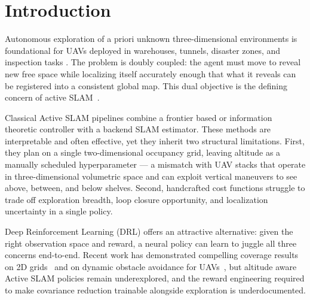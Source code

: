 \documentclass[conference]{IEEEtran}
\begin{document}
\section{Introduction}

Autonomous exploration of a priori unknown three-dimensional environments is foundational for UAVs deployed in warehouses, tunnels, disaster zones, and inspection tasks \cite{qin2019autonomous, zhang2026adaptive}. The problem is doubly coupled: the agent must move to reveal new free space while localizing itself accurately enough that what it reveals can be registered into a consistent global map. This dual objective is the defining concern of active SLAM~\cite{placed2023survey, zhang2026u}.

Classical Active SLAM pipelines combine a frontier based or information theoretic controller with a backend SLAM estimator. These methods are interpretable and often effective, yet they inherit two structural limitations. First, they plan on a single two-dimensional occupancy grid, leaving altitude as a manually scheduled hyperparameter --- a mismatch with UAV stacks that operate in three-dimensional volumetric space and can exploit vertical maneuvers to see above, between, and below shelves. Second, handcrafted cost functions struggle to trade off exploration breadth, loop closure opportunity, and localization uncertainty in a single policy.

Deep Reinforcement Learning (DRL) offers an attractive alternative: given the right observation space and reward, a neural policy can learn to juggle all three concerns end-to-end. Recent work has demonstrated compelling coverage results on 2D grids~\cite{yin2025maslam,chen2024lidar,zhao2024ddpg} and on dynamic obstacle avoidance for UAVs~\cite{xu2025navrl}, but altitude aware Active SLAM policies remain underexplored, and the reward engineering required to make covariance reduction trainable alongside exploration is underdocumented.
\end{document}
